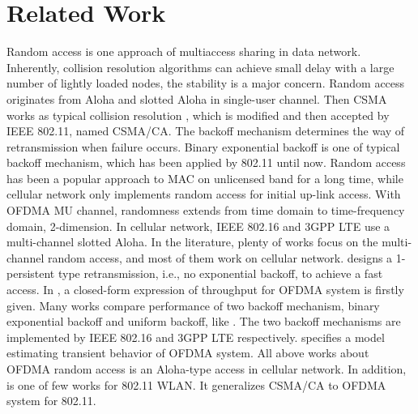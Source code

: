 \section{Related Work}
Random access is one approach of multiaccess sharing in data network.
Inherently, collision resolution algorithms can achieve small delay with a large number of lightly loaded nodes, the stability is a major concern\cite{bertsekas1992data}\cite{chen1994medium}.  
Random access originates from Aloha and slotted Aloha in single-user channel. 
Then CSMA works as typical collision resolution  \cite{kleinrock1975packet}, which is modified and then accepted by IEEE 802.11, named CSMA/CA. 
The backoff mechanism determines the way of retransmission when failure occurs. 
Binary exponential backoff is one of typical backoff mechanism, which has been applied by 802.11 until now.
Random access has been a popular approach to MAC on unlicensed band for a long time, while cellular network  only implements random access for initial up-link access. 
With OFDMA MU channel, randomness extends from time domain to time-frequency domain, 2-dimension. 
In cellular network, IEEE 802.16 and 3GPP LTE use a multi-channel slotted Aloha.
In the literature, plenty of works focus on the multi-channel random access, and most of them work on cellular network.
\cite{choi2006multichannel} designs a 1-persistent type retransmission, i.e., no exponential backoff, to achieve a fast access.  
In \cite{zhou2008efficient}, a closed-form expression of throughput for OFDMA system is firstly given.
Many works compare performance of two backoff mechanism, binary exponential backoff and uniform backoff, like \cite{zhou2008efficient} \cite{seo2011design} \cite{kim2012performance}.
The two backoff mechanisms are implemented by IEEE 802.16 and 3GPP LTE respectively.  \cite{wei2015modeling} specifies a model estimating transient behavior of OFDMA system.
All above works about OFDMA random access is an Aloha-type access in cellular network.
In addition, \cite{GeneralizedOFDMACSMACA} is one of few works for 802.11 WLAN. 
It generalizes CSMA/CA to OFDMA system for 802.11.

